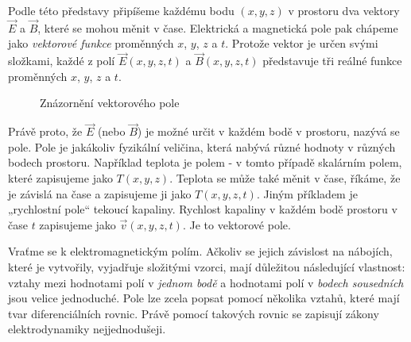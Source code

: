       Podle této představy připíšeme každému bodu \((x, y, z)\) v prostoru dva vektory \(\vec{E}\) a 
      \(\vec{B}\), které se mohou měnit v čase. Elektrická a magnetická pole pak chápeme jako 
      \emph{vektorové funkce} proměnných \(x\), \(y\), \(z\) a \(t\). Protože vektor je určen svými 
      složkami, každé z polí \(\vec{E}(x, y, z, t)\) a \(\vec{B}(x, y, z, t)\) představuje tři 
      reálné funkce proměnných \(x\), \(y\), \(z\) a \(t\).
      
      \begin{figure}[ht!]
        \centering
          \hspace{0.1\textwidth}                                                                       
        \caption{Znázornění vektorového pole}
      \end{figure} 
    
      Právě proto, že \(\vec{E}\) (nebo \(\vec{B}\)) je možné určit v každém bodě v prostoru, nazývá 
      se pole. Pole je jakákoliv fyzikální veličina, která nabývá různé hodnoty v různých bodech 
      prostoru. Například teplota je polem - v tomto případě skalárním polem, které zapisujeme jako 
      \(T(x, y, z)\). Teplota se může také měnit v čase, říkáme, že je závislá na čase a zapisujeme 
      ji jako \(T(x, y, z, t)\). Jiným příkladem  je „rychlostní pole“ tekoucí kapaliny. Rychlost 
      kapaliny v každém bodě prostoru v čase \(t\) zapisujeme jako \(\vec{v}(x, y, z, t)\). Je to 
      vektorové pole.
    
      Vraťme se k elektromagnetickým polím. Ačkoliv se jejich závislost na nábojích, které je vytvořily, 
      vyjadřuje složitými vzorci, mají důležitou následující vlastnost: vztahy mezi hodnotami polí v 
      \emph{jednom bodě} a hodnotami polí v \emph{bodech sousedních} jsou velice jednoduché. Pole lze zcela 
      popsat pomocí několika vztahů, které mají tvar diferenciálních rovnic. Právě pomocí takových rovnic se 
      zapisují zákony elektrodynamiky nejjednodušeji.
    
